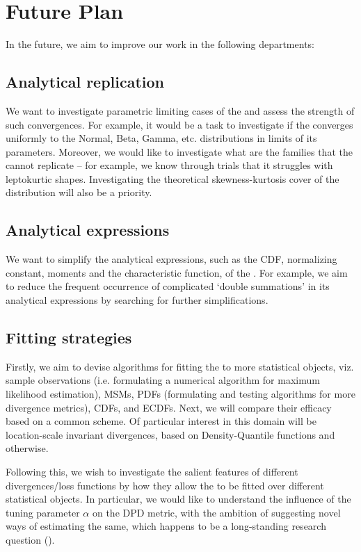 \section{Future Plan}
In the future, we aim to improve our work in the following departments:

\subsection{Analytical replication}
We want to investigate parametric limiting cases of the \sindist{} and assess the strength of such convergences. For example, it would be a task to investigate if the \sindist{} converges uniformly to the Normal, Beta, Gamma, etc. distributions in limits of its parameters. Moreover, we would like to investigate what are the families that the \sindist{} cannot replicate -- for example, we know through trials that it struggles with leptokurtic shapes. Investigating the theoretical skewness-kurtosis cover of the distribution will also be a priority.

\subsection{Analytical expressions}
We want to simplify the analytical expressions, such as the CDF, normalizing constant, moments and the characteristic function, of the \sindist. For example, we aim to reduce the frequent occurrence of complicated `double summations' in its analytical expressions by searching for further simplifications.

\subsection{Fitting strategies}
Firstly, we aim to devise algorithms for fitting the \sindist{} to more statistical objects, viz. sample observations (i.e. formulating a numerical algorithm for maximum likelihood estimation), MSMs, PDFs (formulating and testing algorithms for more divergence metrics), CDFs, and ECDFs. Next, we will compare their efficacy based on a common scheme. Of particular interest in this domain will be location-scale invariant divergences, based on Density-Quantile functions and otherwise.

Following this, we wish to investigate the salient features of different divergences/loss functions by how they allow the \sindist{} to be fitted over different statistical objects. In particular, we would like to understand the influence of the tuning parameter $\alpha$ on the DPD metric, with the ambition of suggesting novel ways of estimating the same, which happens to be a long-standing research question (\cite{basak2021dpd}).

